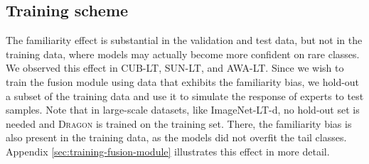 \documentclass[10pt,twocolumn,letterpaper]{article}
\newcommand{\DRAGON}{\textsc{Dragon}}
\begin{document}
\subsection{Training scheme} 
The familiarity effect is substantial in the validation and test data, but not in the training data, where models may actually become more confident on rare classes. We observed this effect in CUB-LT, SUN-LT, and AWA-LT. 
Since we wish to train the fusion module using data that exhibits the familiarity bias, we hold-out a subset of the training data and use it to simulate the response of experts to test samples. 
Note that in large-scale datasets, like ImageNet-LT-d, no hold-out set is needed and \DRAGON{} is trained on the training set. There, the familiarity bias is also present in the training data, as the models did not overfit the tail classes. Appendix \ref{sec:training-fusion-module} illustrates this effect in more detail.
\end{document}
